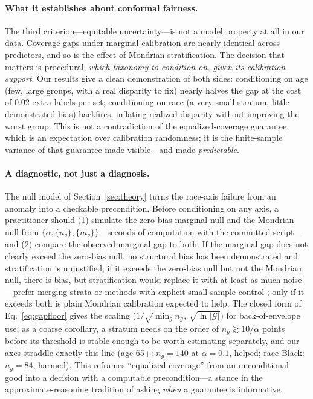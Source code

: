 \documentclass[review,12pt]{elsarticle}
\begin{document}
\paragraph{What it establishes about conformal fairness.}
The third criterion---equitable uncertainty---is not a model property at all in our data. Coverage gaps under marginal calibration are nearly identical across predictors, and so is the effect of Mondrian stratification. The decision that matters is procedural: \emph{which taxonomy to condition on, given its calibration support}. Our results give a clean demonstration of both sides: conditioning on age (few, large groups, with a real disparity to fix) nearly halves the gap at the cost of $0.02$ extra labels per set; conditioning on race (a very small stratum, little demonstrated bias) backfires, inflating realized disparity without improving the worst group. This is not a contradiction of the equalized-coverage guarantee, which is an expectation over calibration randomness; it is the finite-sample variance of that guarantee made visible---and made \emph{predictable}.

\paragraph{A diagnostic, not just a diagnosis.}
The null model of Section~\ref{sec:theory} turns the race-axis failure from an anomaly into a checkable precondition. Before conditioning on any axis, a practitioner should (1) simulate the zero-bias marginal null and the Mondrian null from $\{\alpha, \{n_g\}, \{m_g\}\}$---seconds of computation with the committed script---and (2) compare the observed marginal gap to both. If the marginal gap does not clearly exceed the zero-bias null, no structural bias has been demonstrated and stratification is unjustified; if it exceeds the zero-bias null but not the Mondrian null, there is bias, but stratification would replace it with at least as much noise---prefer merging strata or methods with explicit small-sample control \cite{gibbs2023,jung2023,ding2023,lofstrom2015}; only if it exceeds both is plain Mondrian calibration expected to help. The closed form of Eq.~\eqref{eq:gapfloor} gives the scaling ($1/\sqrt{\min_g n_g}$, $\sqrt{\ln|\mathcal{G}|}$) for back-of-envelope use; as a coarse corollary, a stratum needs on the order of $n_g \gtrsim 10/\alpha$ points before its threshold is stable enough to be worth estimating separately, and our axes straddle exactly this line (age 65+: $n_g = 140$ at $\alpha=0.1$, helped; race Black: $n_g = 84$, harmed). This reframes ``equalized coverage'' from an unconditional good into a decision with a computable precondition---a stance in the approximate-reasoning tradition of asking \emph{when} a guarantee is informative.
\end{document}
